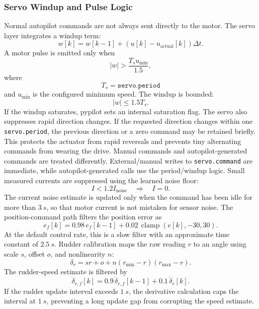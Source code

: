 \documentclass[10pt,twocolumn]{article}
\newcommand{\abs}[1]{\left\lvert #1 \right\rvert}
\begin{document}
\subsubsection{Servo Windup and Pulse Logic}
Normal autopilot commands are not always sent directly to the motor.  The
servo layer integrates a windup term:
\[
w[k]
=
w[k-1]
+
\left(u[k]-u_{\mathrm{actual}}[k]\right)\Delta t .
\]
A motor pulse is emitted only when
\[
\abs{w}
>
\frac{T_s u_{\min}}{1.5},
\]
where
\[
T_s = \texttt{servo.period}
\]
and \(u_{\min}\) is the configured minimum speed.  The windup is bounded:
\[
\abs{w}
\le
1.5T_s .
\]
If the windup saturates, pypilot sets an internal saturation flag.
The servo also suppresses rapid direction changes.  If the requested
direction changes within one \texttt{servo.period}, the previous direction
or a zero command may be retained briefly.  This protects the actuator
from rapid reversals and prevents tiny alternating commands from wearing
the drive.
Manual commands and autopilot-generated commands are treated differently.
External/manual writes to \texttt{servo.command} are immediate, while
autopilot-generated calls use the period/windup logic.
Small measured currents are suppressed using the learned noise floor:
\[
I < 1.2 I_{\mathrm{noise}}
\quad\Longrightarrow\quad
I=0.
\]
The current noise estimate is updated only when the command has been idle
for more than \(\SI{3}{s}\), so that motor current is not mistaken for
sensor noise.
The position-command path filters the position error as
\[
e_f[k]
=
0.98\,e_f[k-1]
+
0.02\,\operatorname{clamp}(e[k],-30,30).
\]
At the default control rate, this is a slow filter with an approximate
time constant of \(\SI{2.5}{s}\).  Rudder calibration maps the raw reading
\(r\) to an angle using scale \(s\), offset \(o\), and nonlinearity \(n\):
\[
\delta_r
=
s r
+
o
+
n(r_{\min}-r)(r_{\max}-r).
\]
The rudder-speed estimate is filtered by
\[
\dot{\delta}_{r,f}[k]
=
0.9\,\dot{\delta}_{r,f}[k-1]
+
0.1\,\dot{\delta}_{r}[k].
\]
If the rudder update interval exceeds \(\SI{1}{s}\), the derivative
calculation caps the interval at \(\SI{1}{s}\), preventing a long update
gap from corrupting the speed estimate.
\end{document}
